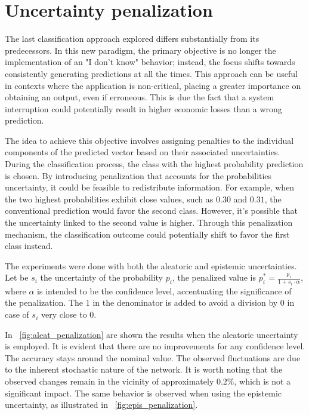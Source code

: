 \section{Uncertainty penalization}

The last classification approach explored differs substantially from its predecessors. In this new paradigm, the primary objective is no longer the implementation of an "I don't know" behavior; instead, the focus shifts towards consistently generating predictions at all the times. This approach can be useful in contexts where the application is non-critical, placing a greater importance on obtaining an output, even if erroneous. This is due the fact that a system interruption could potentially result in higher economic losses than a wrong prediction.

The idea to achieve this objective involves assigning penalties to the individual components of the predicted vector based on their associated uncertainties. During the classification process, the class with the highest probability prediction is chosen. By introducing penalization that accounts for the probabilities uncertainty, it could be feasible to redistribute information. For example, when the two highest probabilities exhibit close values, such as $0.30$ and $0.31$, the conventional prediction would favor the second class. However, it's possible that the uncertainty linked to the second value is higher. Through this penalization mechanism, the classification outcome could potentially shift to favor the first class instead.

The experiments were done with both the aleatoric and epistemic uncertainties. Let be $s_i$ the uncertainty of the probability $p_i$, the penalized value is $p_i^* = \frac{p_i}{1 + s_i \cdot \alpha}$, where $\alpha$ is intended to be the confidence level, accentuating the significance of the penalization. The $1$ in the denominator is added to avoid a division by $0$ in case of $s_i$ very close to $0$.

In \Fig~\ref{fig:aleat_penalization} are shown the results when the aleatoric uncertainty is employed. It is evident that there are no improvements for any confidence level. The accuracy stays around the nominal value. The observed fluctuations are due to the inherent stochastic nature of the network. It is worth noting that the observed changes remain in the vicinity of approximately $0.2\%$, which is not a significant impact. The same behavior is observed when using the epistemic uncertainty, as illustrated in \Fig~\ref{fig:epis_penalization}.

